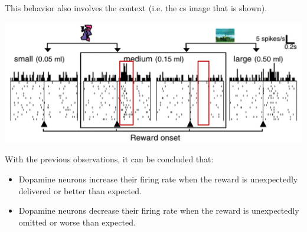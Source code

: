 \begin{description}
\begin{casestudy}
            This behavior also involves the context (i.e. the \ac{cs} image that is shown).
            \begin{center}
                \includegraphics[width=0.6\linewidth]{./img/dopamine_expected3.png}
            \end{center}
        \end{casestudy}
\end{description}

\begin{remark}
    With the previous observations, it can be concluded that:
    \begin{itemize}
        \item Dopamine neurons increase their firing rate when the reward is unexpectedly delivered or better than expected.
        \item Dopamine neurons decrease their firing rate when the reward is unexpectedly omitted or worse than expected.
    \end{itemize}
\end{remark}

